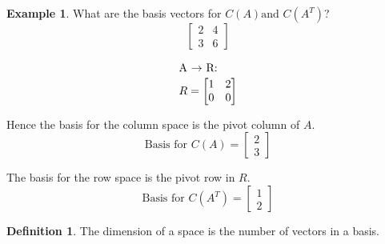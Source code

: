 \documentclass[12pt, letterpaper]{article}
\theoremstyle{definition}
\newtheorem{definition}{Definition}[section]
\newtheorem{example}{Example}
\begin{document}
		\begin{example}
			What are the basis vectors for $C(A) \text{and } C(A^T)$?
				$$\begin{bmatrix} 2 & 4 \\ 3 & 6 \end{bmatrix}$$
				
				\begin{gather*}
					\intertext{A $\rightarrow$ R:}
						R = \begin{bmatrix} 1 & 2 \\ 0 & 0 \end{bmatrix}
				\end{gather*}
			
			\noindent Hence the basis for the column space is the pivot column of $A$.
				\begin{equation*}
					\text{Basis for } C(A) = \begin{bmatrix} 2 \\ 3 \end{bmatrix}
				\end{equation*}
				
			\noindent The basis for the row space is the pivot row in $R$.
				\begin{equation*}
					\text{Basis for } C(A^T) = \begin{bmatrix} 1 \\ 2 \end{bmatrix}
				\end{equation*}
		\end{example}
	
	
		\begin{definition}
			The dimension of a space is the number of vectors in a basis.
		\end{definition}
	
	
	
	
\end{document}

